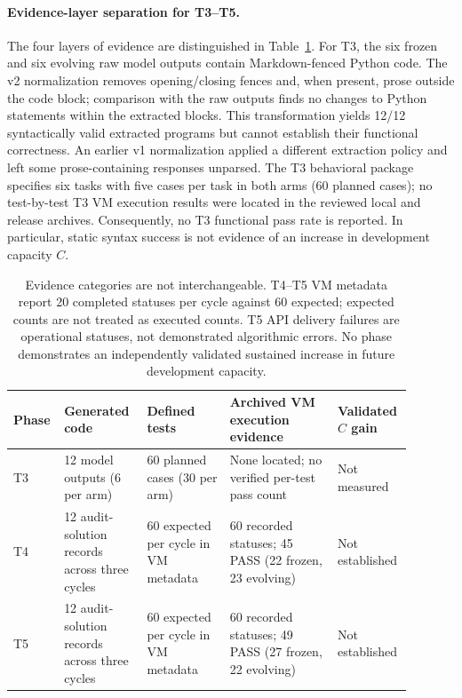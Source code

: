 \documentclass[11pt,a4paper]{article}
\begin{document}
\paragraph{Evidence-layer separation for T3--T5.}
The four layers of evidence are distinguished in Table~\ref{tab:t3t5-evidence}. For T3, the six frozen and six evolving raw model outputs contain Markdown-fenced Python code. The v2 normalization removes opening/closing fences and, when present, prose outside the code block; comparison with the raw outputs finds no changes to Python statements within the extracted blocks. This transformation yields 12/12 syntactically valid extracted programs but cannot establish their functional correctness. An earlier v1 normalization applied a different extraction policy and left some prose-containing responses unparsed. The T3 behavioral package specifies six tasks with five cases per task in both arms (60 planned cases); no test-by-test T3 VM execution results were located in the reviewed local and release archives. Consequently, no T3 functional pass rate is reported. In particular, static syntax success is not evidence of an increase in development capacity $C$.
\begin{table}[htbp]
\centering\scriptsize
\begin{tabular}{p{0.09\linewidth}p{0.20\linewidth}p{0.20\linewidth}p{0.26\linewidth}p{0.14\linewidth}}
\hline
Phase & Generated code & Defined tests & Archived VM execution evidence & Validated $C$ gain \\
\hline
T3 & 12 model outputs (6 per arm) & 60 planned cases (30 per arm) & None located; no verified per-test pass count & Not measured \\
T4 & 12 audit-solution records across three cycles & 60 expected per cycle in VM metadata & 60 recorded statuses; 45 PASS (22 frozen, 23 evolving) & Not established \\
T5 & 12 audit-solution records across three cycles & 60 expected per cycle in VM metadata & 60 recorded statuses; 49 PASS (27 frozen, 22 evolving) & Not established \\
\hline
\end{tabular}
\caption{Evidence categories are not interchangeable. T4--T5 VM metadata report 20 completed statuses per cycle against 60 expected; expected counts are not treated as executed counts. T5 API delivery failures are operational statuses, not demonstrated algorithmic errors. No phase demonstrates an independently validated sustained increase in future development capacity.}\label{tab:t3t5-evidence}
\end{table}
\end{document}
